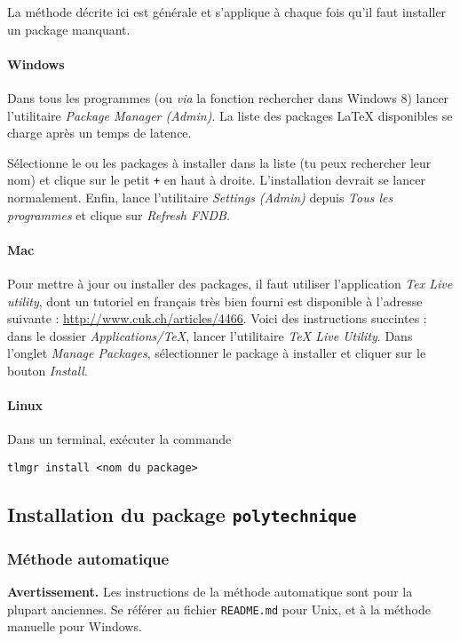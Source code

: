 \documentclass[a4paper,12pt,twoside]{article}
\begin{document}
La méthode décrite ici est générale et s'applique à chaque fois qu'il faut installer un package manquant.

\paragraph{Windows} Dans tous les programmes (ou \emph{via} la fonction rechercher dans Windows 8) lancer l'utilitaire \emph{Package Manager (Admin)}. La liste des packages LaTeX disponibles se charge après un temps de latence. 

Sélectionne le ou les packages à installer dans la liste (tu peux rechercher leur nom) et clique sur le petit \texttt{+} en haut à droite. L'installation devrait se lancer normalement. Enfin, lance l'utilitaire \emph{Settings (Admin)} depuis \emph{Tous les programmes} et clique sur \emph{Refresh FNDB}.

\paragraph{Mac} Pour mettre à jour ou installer des packages, il faut utiliser l'application \emph{Tex Live utility}, dont un tutoriel en français très bien fourni est disponible à l'adresse suivante : \url{http://www.cuk.ch/articles/4466}. Voici des instructions succintes : dans le dossier \emph{Applications/TeX}, lancer l'utilitaire \emph{TeX Live Utility}. Dans l'onglet \emph{Manage Packages}, sélectionner le package à installer et cliquer sur le bouton \emph{Install}.

\paragraph{Linux} Dans un terminal, exécuter la commande 
\begin{verbatim}
tlmgr install <nom du package>
\end{verbatim}


\subsection{Installation du package \texttt{polytechnique}}

\subsubsection{Méthode automatique}

\textbf{Avertissement.} Les instructions de la méthode automatique sont pour la plupart anciennes. Se référer au fichier \texttt{README.md} pour Unix, et à la méthode manuelle pour Windows.
\end{document}
